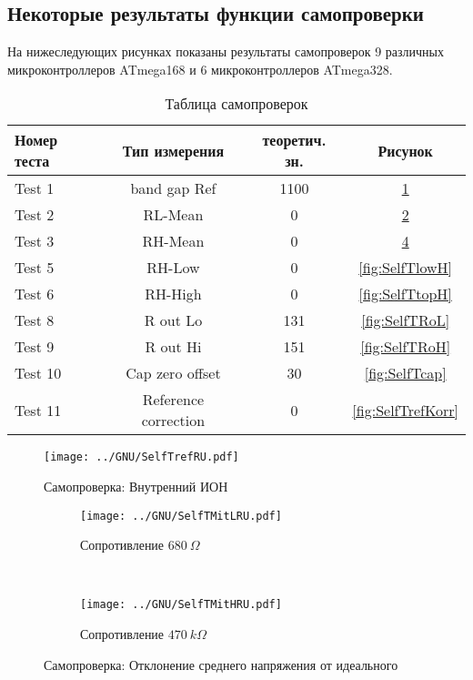 \subsection{Некоторые результаты функции самопроверки}

На нижеследующих рисунках показаны результаты самопроверок 9 различных микроконтроллеров ATmega168 и 6 
микроконтроллеров ATmega328.

\begin{table}[H]
  \begin{center}
    \begin{tabular}{| l | c | c | c |}
    \hline
Номер теста & Тип измерения & теоретич. зн. & Рисунок \\
    \hline
    \hline
Test 1 & band gap Ref  & 1100 & \ref{fig:SelfTref} \\
    \hline
Test 2 & RL-Mean & 0 & \ref{fig:SelfTMitL} \\
    \hline
Test 3 & RH-Mean & 0 & \ref{fig:SelfTMitH} \\
    \hline
Test 5 & RH-Low &  0 & \ref{fig:SelfTlowH} \\
    \hline
Test 6 & RH-High & 0 & \ref{fig:SelfTtopH} \\
    \hline
Test 8 & R out Lo & 131 & \ref{fig:SelfTRoL} \\
    \hline
Test 9 & R out Hi & 151 & \ref{fig:SelfTRoH} \\
    \hline
Test 10 & Cap zero offset & 30 & \ref{fig:SelfTcap} \\
    \hline
Test 11 & Reference correction & 0 & \ref{fig:SelfTrefKorr} \\
    \hline
    \end{tabular}
  \end{center}
  \caption{Таблица самопроверок}
  \label{tab:test_m168} 
\end{table}

\begin{figure}[H]
\centering
\texttt{[image: ../GNU/SelfTrefRU.pdf]}
\caption{Самопроверка: Внутренний ИОН}
\label{fig:SelfTref}
\end{figure}


\begin{figure}[H]
  \begin{subfigure}[b]{.5\textwidth}
    \centering
    \texttt{[image: ../GNU/SelfTMitLRU.pdf]}
    \caption{Сопротивление \(680~\Omega\)}
    \label{fig:SelfTMitL}
  \end{subfigure}
  ~
  \begin{subfigure}[b]{.5\textwidth}
    \centering
    \texttt{[image: ../GNU/SelfTMitHRU.pdf]}
    \caption{Сопротивление \(470~k\Omega\)}
    \label{fig:SelfTMitH}
  \end{subfigure}
  \caption{Самопроверка: Отклонение среднего напряжения от идеального}
\end{figure}

